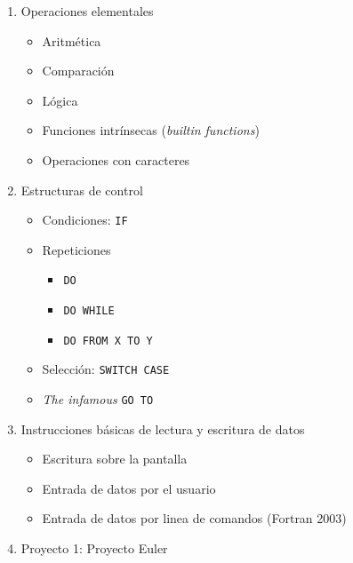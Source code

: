 \begin{description}
\begin{enumerate}
      \item Operaciones elementales
        \begin{itemize}
          \item Aritmética
          \item Comparación
          \item Lógica
          \item Funciones intrínsecas (\textit{builtin functions})
          \item Operaciones con caracteres
        \end{itemize}

      \item Estructuras de control
        \begin{itemize}
          \item Condiciones: \texttt{IF}
          \item Repeticiones
            \begin{itemize}
              \item \texttt{DO}
              \item \texttt{DO WHILE}
              \item \texttt{DO FROM X TO Y}
            \end{itemize}
          \item Selección: \texttt{SWITCH CASE}
          \item \textit{The infamous} \texttt{GO TO}
        \end{itemize}

      \item Instrucciones básicas de lectura y escritura de datos
        \begin{itemize}
          \item Escritura sobre la pantalla
          \item Entrada de datos por el usuario
          \item Entrada de datos por linea de comandos (Fortran 2003)
        \end{itemize}

      \item Proyecto 1: Proyecto Euler
    \end{enumerate}


\end{description}
